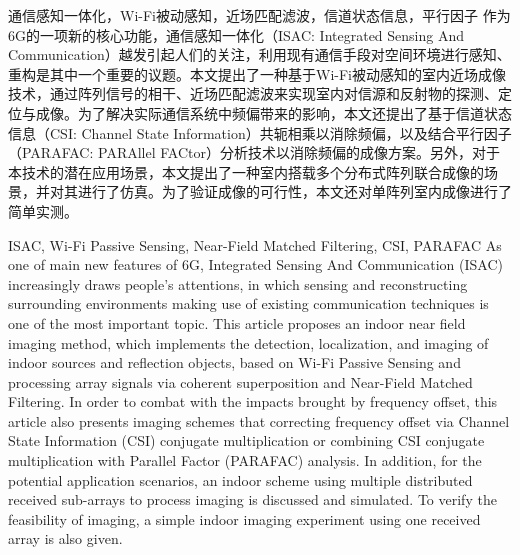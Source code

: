 \begin{中文摘要}{通信感知一体化，Wi-Fi被动感知，近场匹配滤波，信道状态信息，平行因子}
作为6G的一项新的核心功能，通信感知一体化（ISAC: Integrated Sensing And Communication）越发引起人们的关注，利用现有通信手段对空间环境进行感知、重构是其中一个重要的议题。本文提出了一种基于Wi-Fi被动感知的室内近场成像技术，通过阵列信号的相干、近场匹配滤波来实现室内对信源和反射物的探测、定位与成像。为了解决实际通信系统中频偏带来的影响，本文还提出了基于信道状态信息（CSI: Channel State Information）共轭相乘以消除频偏，以及结合平行因子（PARAFAC: PARAllel FACtor）分析技术以消除频偏的成像方案。另外，对于本技术的潜在应用场景，本文提出了一种室内搭载多个分布式阵列联合成像的场景，并对其进行了仿真。为了验证成像的可行性，本文还对单阵列室内成像进行了简单实测。
\end{中文摘要}

\begin{英文摘要}{ISAC, Wi-Fi Passive Sensing, Near-Field Matched Filtering, CSI, PARAFAC}
As one of main new features of 6G, Integrated Sensing And Communication (ISAC) increasingly draws people's attentions, in which sensing and reconstructing surrounding environments making use of existing communication techniques is one of the most important topic. This article proposes an indoor near field imaging method, which implements the detection, localization, and imaging of indoor sources and reflection objects, based on Wi-Fi Passive Sensing and processing array signals via coherent superposition and Near-Field Matched Filtering. In order to combat with the impacts brought by frequency offset, this article also presents imaging schemes that correcting frequency offset via Channel State Information (CSI) conjugate multiplication or combining CSI conjugate multiplication with Parallel Factor (PARAFAC) analysis. In addition, for the potential application scenarios, an indoor scheme using multiple distributed received sub-arrays to process imaging is discussed and simulated. To verify the feasibility of imaging, a simple indoor imaging experiment using one received array is also given.
\end{英文摘要}
